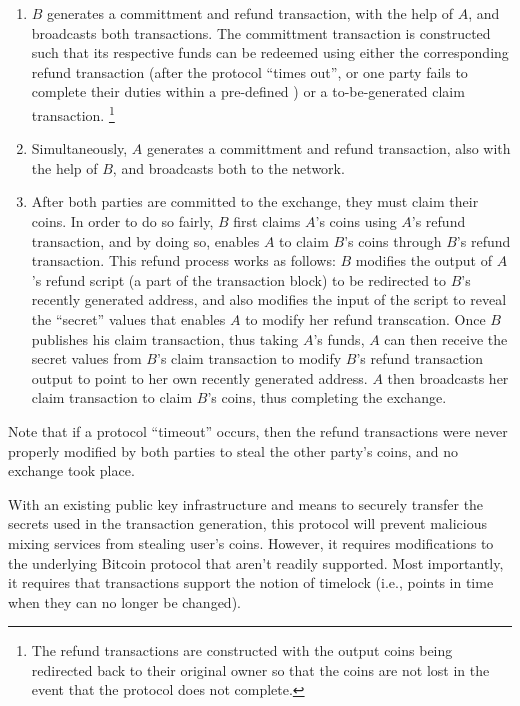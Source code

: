 \begin{enumerate}
	\item $B$ generates a committment and refund transaction, with the help of $A$, and broadcasts both transactions. The committment transaction is constructed such that its respective funds can be redeemed using either the corresponding refund transaction (after the protocol ``times out'', or one party fails to complete their duties within a pre-defined ) or a to-be-generated claim transaction. \footnote{The refund transactions are constructed with the output coins being redirected back to their original owner so that the coins are not lost in the event that the protocol does not complete.}
	\item Simultaneously, $A$ generates a committment and refund transaction, also with the help of $B$, and broadcasts both to the network. 
	\item After both parties are committed to the exchange, they must claim their coins. In order to do so fairly, $B$ first claims $A$'s coins using $A$'s refund transaction, and by doing so, enables $A$ to claim $B$'s coins through $B$'s refund transaction. This refund process works as follows: $B$ modifies the output of $A$'s refund script (a part of the transaction block) to be redirected to $B$'s recently generated address, and also modifies the input of the script to reveal the ``secret'' values that enables $A$ to modify her refund transcation. Once $B$ publishes his claim transaction, thus taking $A$'s funds, $A$ can then receive the secret values from $B$'s claim transaction to modify $B$'s refund transaction output to point to her own recently generated address. $A$ then broadcasts her claim transaction to claim $B$'s coins, thus completing the exchange.
\end{enumerate}
Note that if a protocol ``timeout'' occurs, then the refund transactions were never properly modified by both parties to steal the other party's coins, and no exchange took place. 

With an existing public key infrastructure and means to securely transfer the secrets used in the transaction generation, this protocol will prevent malicious mixing services from stealing user's coins. However, it requires modifications to the underlying Bitcoin protocol that aren't readily supported. Most importantly, it requires that transactions support the notion of timelock (i.e., points in time when they can no longer be changed). 

